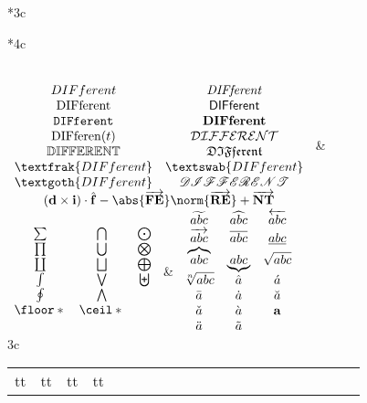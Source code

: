 \begin{longtable}{*3c}
\begin{array}{*4c}
\end{array}\) \\
\(\begin{array}{*2c}
DIFferent          & %
\mathit{DIFferent} \\ %
\mathrm{DIFferent} & %
\mathsf{DIFferent} \\ %
\mathtt{DIFferent} & %
\mathbf{DIFferent} \\ %
\operatorname{DIFferen}(t) & %
\mathcal{DIFFERENT} \\ %
\mathbb{DIFFERENT} & %
\mathfrak{DIFferent} \\ %
\textfrak{DIFferent} & %
\textswab{DIFferent} \\ %
\textgoth{DIFferent} & %
\mathscr{DIFFERENT} \\ %
\multicolumn 2c{
(\vec d \times \vec i)
 \cdot \uvec f - \abs{\veca{FE}} \norm{\veca{RE}} +
 \veca{NT}} \\
\end{array}\) &
\(\begin{array}{*3c}
\sum&\bigcap&\bigodot\\
\prod&\bigcup&\bigotimes\\
\coprod&\bigsqcup&\bigoplus\\
\int&\bigvee&\biguplus\\
\oint&\bigwedge\\
\floor*{} & \ceil*{} \\
\end{array}\) &
\(\begin{array}{*3c}
\widetilde{abc}&\widehat{abc}&\overleftarrow{abc}\\
\overrightarrow{abc}&\overline{abc}&\underline{abc}\\
\overbrace{abc}&\underbrace{abc}&\sqrt{abc}\\
\sqrt[n]{abc}&\hat a&\acute a\\
\bar a&\dot a&\breve a\\
\check a&\grave a&\vec a\\
\ddot a&\tilde a\\
\end{array}\) \\
\multicolumn 3c{
\begin{tabular}{*{21}c}
{\color{AntiqueWhite1} t}\textcolor{AntiqueWhite1} t &
{\color{AntiqueWhite2} t}\textcolor{AntiqueWhite2} t &
{\color{AntiqueWhite3} t}\textcolor{AntiqueWhite3} t &
{\color{AntiqueWhite4} t}\textcolor{AntiqueWhite4} t &

\end{tabular}}
\end{longtable}
